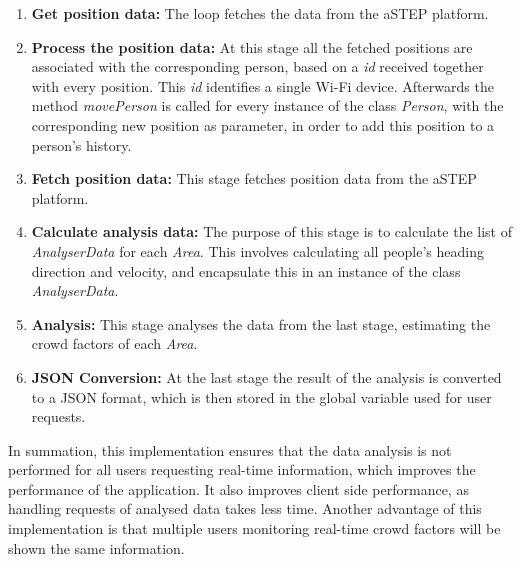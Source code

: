 \begin{enumerate}
	\item \textbf{Get position data:} The loop fetches the data from the aSTEP platform.
    \item \textbf{Process the position data:} At this stage all the fetched positions are associated with the corresponding person, based on a \emph{id} received together with every position. This \emph{id} identifies a single Wi-Fi device. Afterwards the method \emph{movePerson} is called for every instance of the class \emph{Person}, with the corresponding new position as parameter, in order to add this position to a person's history.
    \item \textbf{Fetch position data:} This stage fetches position data from the aSTEP platform.
    \item \textbf{Calculate analysis data:} The purpose of this stage is to calculate the list of \emph{AnalyserData} for each \emph{Area}. This involves calculating all people's heading direction and velocity, and encapsulate this in an instance of the class \emph{AnalyserData}.
    \item \textbf{Analysis:} This stage analyses the data from the last stage, estimating the crowd factors of each \emph{Area}.
    \item \textbf{JSON Conversion:} At the last stage the result of the analysis is converted to a JSON format, which is then stored in the global variable used for user requests.
\end{enumerate}

In summation, this implementation ensures that the data analysis is not performed for all users requesting real-time information, which improves the performance of the application. It also improves client side performance, as handling requests of analysed data takes less time. Another advantage of this implementation is that multiple users monitoring real-time crowd factors will be shown the same information.